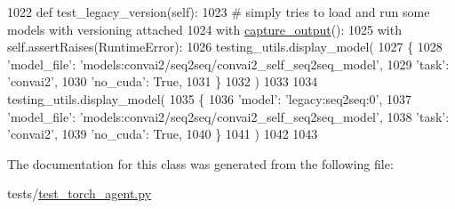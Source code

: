 \begin{DoxyCode}
1022     \textcolor{keyword}{def }test\_legacy\_version(self):
1023         \textcolor{comment}{# simply tries to load and run some models with versioning attached}
1024         with \hyperlink{namespaceparlai_1_1utils_1_1testing_ab00d4d693202afab92c06387aa50699b}{capture\_output}():
1025             with self.assertRaises(RuntimeError):
1026                 testing\_utils.display\_model(
1027                     \{
1028                         \textcolor{stringliteral}{'model\_file'}: \textcolor{stringliteral}{'models:convai2/seq2seq/convai2\_self\_seq2seq\_model'},
1029                         \textcolor{stringliteral}{'task'}: \textcolor{stringliteral}{'convai2'},
1030                         \textcolor{stringliteral}{'no\_cuda'}: \textcolor{keyword}{True},
1031                     \}
1032                 )
1033 
1034             testing\_utils.display\_model(
1035                 \{
1036                     \textcolor{stringliteral}{'model'}: \textcolor{stringliteral}{'legacy:seq2seq:0'},
1037                     \textcolor{stringliteral}{'model\_file'}: \textcolor{stringliteral}{'models:convai2/seq2seq/convai2\_self\_seq2seq\_model'},
1038                     \textcolor{stringliteral}{'task'}: \textcolor{stringliteral}{'convai2'},
1039                     \textcolor{stringliteral}{'no\_cuda'}: \textcolor{keyword}{True},
1040                 \}
1041             )
1042 
1043 
\end{DoxyCode}


The documentation for this class was generated from the following file\+:\begin{DoxyCompactItemize}
\item 
tests/\hyperlink{test__torch__agent_8py}{test\+\_\+torch\+\_\+agent.\+py}\end{DoxyCompactItemize}
